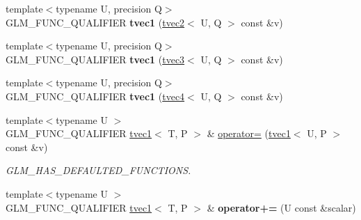 \begin{DoxyCompactItemize}
\item 
\hypertarget{structglm_1_1tvec1_aa4a3f51c325290246b45719118a931fd}{{\footnotesize template$<$typename U, precision Q$>$ }\\G\-L\-M\-\_\-\-F\-U\-N\-C\-\_\-\-Q\-U\-A\-L\-I\-F\-I\-E\-R {\bfseries tvec1} (\hyperlink{structglm_1_1tvec2}{tvec2}$<$ U, Q $>$ const \&v)}\label{structglm_1_1tvec1_aa4a3f51c325290246b45719118a931fd}

\item 
\hypertarget{structglm_1_1tvec1_a32fc712ec0ad96609a4137fabc8f77c4}{{\footnotesize template$<$typename U, precision Q$>$ }\\G\-L\-M\-\_\-\-F\-U\-N\-C\-\_\-\-Q\-U\-A\-L\-I\-F\-I\-E\-R {\bfseries tvec1} (\hyperlink{structglm_1_1tvec3}{tvec3}$<$ U, Q $>$ const \&v)}\label{structglm_1_1tvec1_a32fc712ec0ad96609a4137fabc8f77c4}

\item 
\hypertarget{structglm_1_1tvec1_a5b66e4f092edc2bb80b4edd12b9cb960}{{\footnotesize template$<$typename U, precision Q$>$ }\\G\-L\-M\-\_\-\-F\-U\-N\-C\-\_\-\-Q\-U\-A\-L\-I\-F\-I\-E\-R {\bfseries tvec1} (\hyperlink{structglm_1_1tvec4}{tvec4}$<$ U, Q $>$ const \&v)}\label{structglm_1_1tvec1_a5b66e4f092edc2bb80b4edd12b9cb960}

\item 
\hypertarget{structglm_1_1tvec1_afd831051f2b79ce40423c5c3c3113829}{{\footnotesize template$<$typename U $>$ }\\G\-L\-M\-\_\-\-F\-U\-N\-C\-\_\-\-Q\-U\-A\-L\-I\-F\-I\-E\-R \hyperlink{structglm_1_1tvec1}{tvec1}$<$ T, P $>$ \& \hyperlink{structglm_1_1tvec1_afd831051f2b79ce40423c5c3c3113829}{operator=} (\hyperlink{structglm_1_1tvec1}{tvec1}$<$ U, P $>$ const \&v)}\label{structglm_1_1tvec1_afd831051f2b79ce40423c5c3c3113829}

\begin{DoxyCompactList}\small\item\em G\-L\-M\-\_\-\-H\-A\-S\-\_\-\-D\-E\-F\-A\-U\-L\-T\-E\-D\-\_\-\-F\-U\-N\-C\-T\-I\-O\-N\-S. \end{DoxyCompactList}\item 
\hypertarget{structglm_1_1tvec1_ab88bc8525c8f28b6734c30f4798e9cc3}{{\footnotesize template$<$typename U $>$ }\\G\-L\-M\-\_\-\-F\-U\-N\-C\-\_\-\-Q\-U\-A\-L\-I\-F\-I\-E\-R \hyperlink{structglm_1_1tvec1}{tvec1}$<$ T, P $>$ \& {\bfseries operator+=} (U const \&scalar)}\label{structglm_1_1tvec1_ab88bc8525c8f28b6734c30f4798e9cc3}


\end{DoxyCompactItemize}
